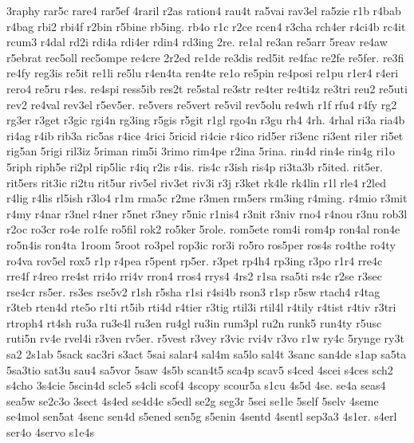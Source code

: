 {3raphy 
rar5c 
rare4 
rar5ef 
4raril 
r2as 
ration4 
rau4t 
ra5vai 
rav3el 
ra5zie 
r1b 
r4bab 
r4bag 
rbi2 
rbi4f 
r2bin 
r5bine 
rb5ing. 
rb4o 
r1c 
r2ce 
rcen4 
r3cha 
rch4er 
r4ci4b 
rc4it 
rcum3 
r4dal 
rd2i 
rdi4a 
rdi4er 
rdin4 
rd3ing 
2re. 
re1al 
re3an 
re5arr 
5reav 
re4aw 
r5ebrat 
rec5oll 
rec5ompe 
re4cre 
2r2ed 
re1de 
re3dis 
red5it 
re4fac 
re2fe 
re5fer. 
re3fi 
re4fy 
reg3is 
re5it 
re1li 
re5lu 
r4en4ta 
ren4te 
re1o 
re5pin 
re4posi 
re1pu 
r1er4 
r4eri 
rero4 
re5ru 
r4es. 
re4spi 
ress5ib 
res2t 
re5stal 
re3str 
re4ter 
re4ti4z 
re3tri 
reu2 
re5uti 
rev2 
re4val 
rev3el 
r5ev5er. 
re5vers 
re5vert 
re5vil 
rev5olu 
re4wh 
r1f 
rfu4 
r4fy 
rg2 
rg3er 
r3get 
r3gic 
rgi4n 
rg3ing 
r5gis 
r5git 
r1gl 
rgo4n 
r3gu 
rh4 
4rh. 
4rhal 
ri3a 
ria4b 
ri4ag 
r4ib 
rib3a 
ric5as 
r4ice 
4rici 
5ricid 
ri4cie 
r4ico 
rid5er 
ri3enc 
ri3ent 
ri1er 
ri5et 
rig5an 
5rigi 
ril3iz 
5riman 
rim5i 
3rimo 
rim4pe 
r2ina 
5rina. 
rin4d 
rin4e 
rin4g 
ri1o 
5riph 
riph5e 
ri2pl 
rip5lic 
r4iq 
r2is 
r4is. 
ris4c 
r3ish 
ris4p 
ri3ta3b 
r5ited. 
rit5er. 
rit5ers 
rit3ic 
ri2tu 
rit5ur 
riv5el 
riv3et 
riv3i 
r3j 
r3ket 
rk4le 
rk4lin 
r1l 
rle4 
r2led 
r4lig 
r4lis 
rl5ish 
r3lo4 
r1m 
rma5c 
r2me 
r3men 
rm5ers 
rm3ing 
r4ming. 
r4mio 
r3mit 
r4my 
r4nar 
r3nel 
r4ner 
r5net 
r3ney 
r5nic 
r1nis4 
r3nit 
r3niv 
rno4 
r4nou 
r3nu 
rob3l 
r2oc 
ro3cr 
ro4e 
ro1fe 
ro5fil 
rok2 
ro5ker 
5role. 
rom5ete 
rom4i 
rom4p 
ron4al 
ron4e 
ro5n4is 
ron4ta 
1room 
5root 
ro3pel 
rop3ic 
ror3i 
ro5ro 
ros5per 
ros4s 
ro4the 
ro4ty 
ro4va 
rov5el 
rox5 
r1p 
r4pea 
r5pent 
rp5er. 
r3pet 
rp4h4 
rp3ing 
r3po 
r1r4 
rre4c 
rre4f 
r4reo 
rre4st 
rri4o 
rri4v 
rron4 
rros4 
rrys4 
4rs2 
r1sa 
rsa5ti 
rs4c 
r2se 
r3sec 
rse4cr 
rs5er. 
rs3es 
rse5v2 
r1sh 
r5sha 
r1si 
r4si4b 
rson3 
r1sp 
r5sw 
rtach4 
r4tag 
r3teb 
rten4d 
rte5o 
r1ti 
rt5ib 
rti4d 
r4tier 
r3tig 
rtil3i 
rtil4l 
r4tily 
r4tist 
r4tiv 
r3tri 
rtroph4 
rt4sh 
ru3a 
ru3e4l 
ru3en 
ru4gl 
ru3in 
rum3pl 
ru2n 
runk5 
run4ty 
r5usc 
ruti5n 
rv4e 
rvel4i 
r3ven 
rv5er. 
r5vest 
r3vey 
r3vic 
rvi4v 
r3vo 
r1w 
ry4c 
5rynge 
ry3t 
sa2 
2s1ab 
5sack 
sac3ri 
s3act 
5sai 
salar4 
sal4m 
sa5lo 
sal4t 
3sanc 
san4de 
s1ap 
sa5ta 
5sa3tio 
sat3u 
sau4 
sa5vor 
5saw 
4s5b 
scan4t5 
sca4p 
scav5 
s4ced 
4scei 
s4ces 
sch2 
s4cho 
3s4cie 
5scin4d 
scle5 
s4cli 
scof4 
4scopy 
scour5a 
s1cu 
4s5d 
4se. 
se4a 
seas4 
sea5w 
se2c3o 
3sect 
4s4ed 
se4d4e 
s5edl 
se2g 
seg3r 
5sei 
se1le 
5self 
5selv 
4seme 
se4mol 
sen5at 
4senc 
sen4d 
s5ened 
sen5g 
s5enin 
4sentd 
4sentl 
sep3a3 
4s1er. 
s4erl 
ser4o 
4servo 
s1e4s 
}
